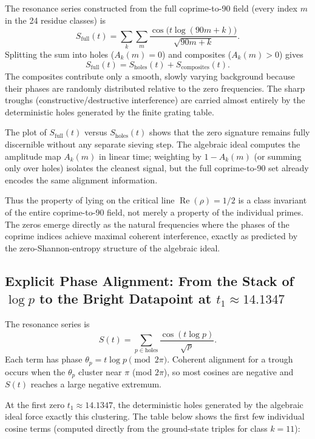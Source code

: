 \documentclass[11pt,a4paper]{article}
\begin{document}
The resonance series constructed from the full coprime-to-90 field (every index \(m\) in the 24 residue classes) is
\[
S_{\text{full}}(t)=\sum_{k}\sum_{m}\frac{\cos\bigl(t\log(90m+k)\bigr)}{\sqrt{90m+k}}.
\]
Splitting the sum into holes (\(A_k(m)=0\)) and composites (\(A_k(m)>0\)) gives
\[
S_{\text{full}}(t)=S_{\text{holes}}(t)+S_{\text{composites}}(t).
\]
The composites contribute only a smooth, slowly varying background because their phases are randomly distributed relative to the zero frequencies. The sharp troughs (constructive/destructive interference) are carried almost entirely by the deterministic holes generated by the finite grating table.

The plot of \(S_{\text{full}}(t)\) versus \(S_{\text{holes}}(t)\) shows that the zero signature remains fully discernible without any separate sieving step. The algebraic ideal computes the amplitude map \(A_k(m)\) in linear time; weighting by \(1-A_k(m)\) (or summing only over holes) isolates the cleanest signal, but the full coprime-to-90 set already encodes the same alignment information.

Thus the property of lying on the critical line \(\operatorname{Re}(\rho)=1/2\) is a class invariant of the entire coprime-to-90 field, not merely a property of the individual primes. The zeros emerge directly as the natural frequencies where the phases of the coprime indices achieve maximal coherent interference, exactly as predicted by the zero-Shannon-entropy structure of the algebraic ideal.



\subsection{Explicit Phase Alignment: From the Stack of \(\log p\) to the Bright Datapoint at \(t_1 \approx 14.1347\)}

The resonance series is
\[
S(t) = \sum_{p \in \text{holes}} \frac{\cos(t \log p)}{\sqrt{p}}.
\]
Each term has phase \(\theta_p = t \log p \pmod{2\pi}\). Coherent alignment for a trough occurs when the \(\theta_p\) cluster near \(\pi\) (mod \(2\pi\)), so most cosines are negative and \(S(t)\) reaches a large negative extremum.

At the first zero \(t_1 \approx 14.1347\), the deterministic holes generated by the algebraic ideal force exactly this clustering. The table below shows the first few individual cosine terms (computed directly from the ground-state triples for class \(k=11\)):
\end{document}
